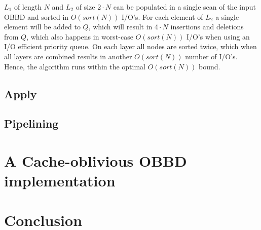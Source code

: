 $L_1$ of length $N$ and $L_2$ of size $2 \cdot N$ can be populated in a single
scan of the input OBBD and sorted in $O(sort(N))$ I/O's. For each element of
$L_2$ a single element will be added to $Q$, which will result in $4 \cdot N$
insertions and deletions from $Q$, which also happens in worst-case $O(sort(N))$
I/O's when using an I/O efficient priority queue. On each layer all nodes are
sorted twice, which when all layers are combined results in another $O(sort(N))$
number of I/O's. Hence, the algorithm runs within the optimal $O(sort(N))$
bound. \cite{Arge96}

\subsection{Apply}


\subsection{Pipelining}


\section{A Cache-oblivious OBBD implementation} \label{sec:implementation}


\section{Conclusion} \label{sec:conclusion}


\printbibliography




